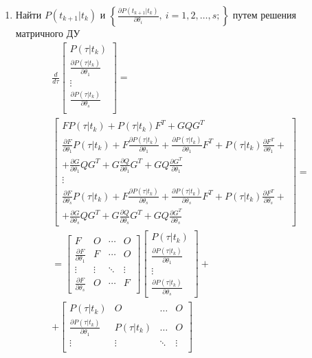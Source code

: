 \documentclass[a4paper,14pt]{extarticle}
\newcommand{\pd}[2]{\frac{\partial #1}{\partial #2}}
\begin{document}
\begin{enumerate}
	\newpage

	\item Найти $P(t_{k+1}| t_k)$ и $\left\{\pd{P(t_{k+1}| t_k)}{\theta_i},\
		i=1,2,\ldots,s;\right\}$ путем решения матричного ДУ
		\begin{gather*}
	\frac{d}{d\tau}	
	\begin{bmatrix}
		P(\tau|t_k) \\
		\pd{P(\tau|t_k)}{\theta_1} \\
		\vdots \\
		\pd{P(\tau|t_k)}{\theta_s} \\
	\end{bmatrix} = \\
	\begin{bmatrix}
		F P(\tau|t_k) + P(\tau|t_k) F^T + GQG^T \\
		\pd{F}{\theta_1} P(\tau|t_k) + F \pd{P(\tau|t_k)}{\theta_1} +
			\pd{P(\tau|t_k)}{\theta_1} F^T + P(\tau|t_k) \pd{F^T}{\theta_1} + \\
			+ \pd{G}{\theta_1} Q G^T + G \pd{Q}{\theta_1} G^T +
			G Q \pd{G^T}{\theta_1} \\
		\vdots \\
		\pd{F}{\theta_s} P(\tau|t_k) + F \pd{P(\tau|t_k)}{\theta_s} +
			\pd{P(\tau|t_k)}{\theta_s} F^T + P(\tau|t_k) \pd{F^T}{\theta_s} + \\
			+ \pd{G}{\theta_s} Q G^T + G \pd{Q}{\theta_s} G^T +
			G Q \pd{G^T}{\theta_s}  
	\end{bmatrix} = \\ =
	\begin{bmatrix}
		F & O & \cdots & O \\
		\pd{F}{\theta_1} & F & \cdots & O \\
		\vdots & \vdots & \ddots & \vdots \\
		\pd{F}{\theta_s} & O & \cdots & F
	\end{bmatrix}
	\begin{bmatrix}
		P(\tau|t_k) \\
		\pd{P(\tau|t_k)}{\theta_1} \\
		\vdots \\
		\pd{P(\tau|t_k)}{\theta_s}
	\end{bmatrix} + \\ +
	\begin{bmatrix}
		P(\tau|t_k) & O & \ldots & O \\
		\pd{P(\tau|t_k)}{\theta_1} & P(\tau|t_k) & \ldots & O \\
		\vdots & \vdots & \ddots & \vdots \\

\end{bmatrix}
\end{gather*}
\end{enumerate}
\end{document}
